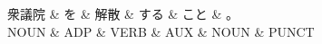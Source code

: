 \documentclass[tikz,border=5pt]{standalone}
\begin{document}
\normalsize
\begin{dependency}[edge unit distance=12.0pt]
    \begin{deptext}[column sep=1em]
        衆議院 \& を \& 解散 \& する \& こと \& 。\\
        NOUN \& ADP \& VERB \& AUX \& NOUN \& PUNCT\\
    \end{deptext}
\end{dependency}
\end{document}
